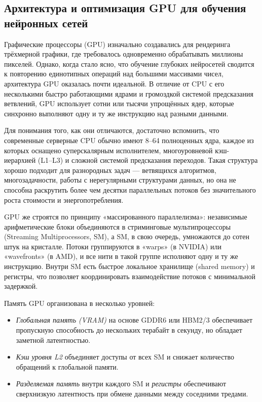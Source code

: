 \subsection{Архитектура и оптимизация GPU для обучения нейронных сетей}
\label{ssec:gpu_architecture}

Графические процессоры (GPU) изначально создавались для рендеринга трёхмерной графики, где требовалось одновременно обрабатывать миллионы пикселей. Однако, когда стало ясно, что обучение глубоких нейросетей сводится к повторению единотипных операций над большими массивами чисел, архитектура GPU оказалась почти идеальной. В отличие от CPU с его несколькими быстро работающими ядрами и громоздкой системой предсказания ветвлений, GPU использует сотни или тысячи упрощённых ядер, которые синхронно выполняют одну и ту же инструкцию над разными данными.   

Для понимания того, как они отличаются, достаточно вспомнить, что современные серверные CPU обычно имеют 8–64 полноценных ядра, каждое из которых оснащено суперскалярным исполнителем, многоуровневой кэш-иерархией (L1–L3) и сложной системой предсказания переходов. Такая структура хорошо подходит для разнородных задач — ветвящихся алгоритмов, многозадачности, работы с нерегулярными структурами данных, но она не способна раскрутить более чем десятки параллельных потоков без значительного роста стоимости и энергопотребления.  

GPU же строятся по принципу «массированного параллелизма»: независимые арифметические блоки объединяются в стриминговые мультипроцессоры (Streaming Multiprocessors, SM), а SM, в свою очередь, умножаются до сотен штук на кристалле. Потоки группируются в «warps» (в NVIDIA) или «wavefronts» (в AMD), и все нити в такой группе исполняют одну и ту же инструкцию. Внутри SM есть быстрое локальное хранилище (shared memory) и регистры, что позволяет координировать взаимодействие потоков с минимальной задержкой.  

Память GPU организована в несколько уровней:  
\begin{itemize}  
  \item \emph{Глобальная память (VRAM)} на основе GDDR6 или HBM2/3 обеспечивает пропускную способность до нескольких терабайт в секунду, но обладает заметной латентностью.  
  \item \emph{Кэш уровня L2} объединяет доступы от всех SM и снижает количество обращений к глобальной памяти.  
  \item \emph{Разделяемая память} внутри каждого SM и \emph{регистры} обеспечивают сверхнизкую латентность при обмене данными между соседними тредами.  
\end{itemize}  

